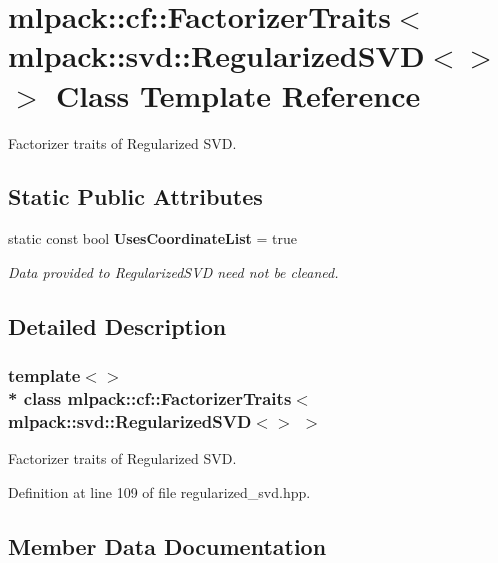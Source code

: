 \section{mlpack\+:\+:cf\+:\+:Factorizer\+Traits$<$ mlpack\+:\+:svd\+:\+:Regularized\+S\+VD$<$$>$ $>$ Class Template Reference}
\label{classmlpack_1_1cf_1_1FactorizerTraits_3_01mlpack_1_1svd_1_1RegularizedSVD_3_4_01_4}


Factorizer traits of Regularized S\+VD.  


\subsection*{Static Public Attributes}
\begin{DoxyCompactItemize}
\item 
static const bool {\bf Uses\+Coordinate\+List} = true
\begin{DoxyCompactList}\small\item\em Data provided to Regularized\+S\+VD need not be cleaned. \end{DoxyCompactList}\end{DoxyCompactItemize}


\subsection{Detailed Description}
\subsubsection*{template$<$$>$\\*
class mlpack\+::cf\+::\+Factorizer\+Traits$<$ mlpack\+::svd\+::\+Regularized\+S\+V\+D$<$$>$ $>$}

Factorizer traits of Regularized S\+VD. 

Definition at line 109 of file regularized\+\_\+svd.\+hpp.



\subsection{Member Data Documentation}
